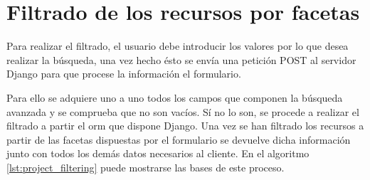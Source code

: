 \section{Filtrado de los recursos por facetas}

Para realizar el filtrado, el usuario debe introducir los valores por lo que desea realizar la búsqueda, una vez hecho ésto se envía una petición POST al servidor Django para que procese la información el formulario.

Para ello se adquiere uno a uno todos los campos que componen la búsqueda avanzada y se comprueba que no son vacíos. Sí no lo son, se procede a realizar el filtrado a partir el \acrshort{orm} que dispone Django. Una vez se han filtrado los recursos a partir de las facetas dispuestas por el formulario se devuelve dicha información junto con todos los demás datos necesarios al cliente. En el algoritmo \ref{lst:project_filtering} puede mostrarse las bases de este proceso.

